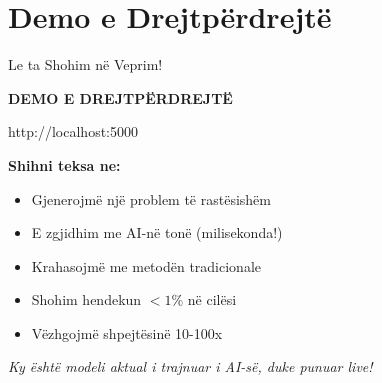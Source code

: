 \documentclass[aspectratio=169]{beamer}
\begin{document}


\section{Demo e Drejtpërdrejtë}

\begin{frame}{Le ta Shohim në Veprim!}
\begin{center}
\LARGE \textbf{DEMO E DREJTPËRDREJTË}

\vspace{1cm}

\large \textcolor{aiblue}{http://localhost:5000}

\vspace{1cm}

\normalsize
\textbf{Shihni teksa ne:}
\begin{itemize}
    \item Gjenerojmë një problem të rastësishëm
    \item E zgjidhim me AI-në tonë (milisekonda!)
    \item Krahasojmë me metodën tradicionale
    \item Shohim hendekun $<1\%$ në cilësi
    \item Vëzhgojmë shpejtësinë 10-100x
\end{itemize}

\vspace{0.5cm}
\textit{Ky është modeli aktual i trajnuar i AI-së, duke punuar live!}
\end{center}
\end{frame}



\end{document}
